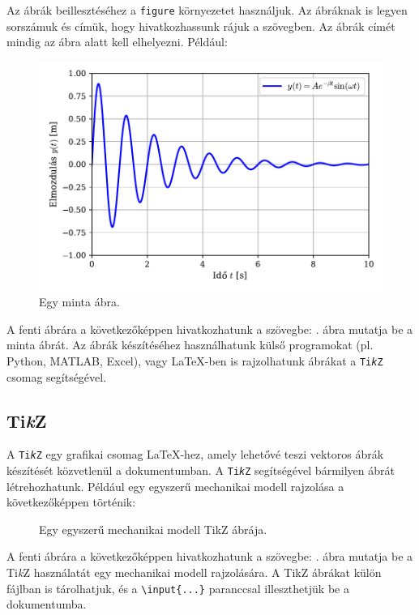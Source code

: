 \documentclass[fleqn,12pt]{article}
\begin{document}
        Az ábrák beillesztéséhez a \texttt{figure} környezetet használjuk. Az ábráknak is legyen sorszámuk és címük, hogy hivatkozhassunk rájuk a szövegben. Az ábrák címét mindig az ábra alatt kell elhelyezni. Például:
        \begin{figure}[htb!]
            \centering
            \includegraphics[width=0.75\linewidth]{figures/sample-fig.pdf}
            \caption{Egy minta ábra.}
            \label{fig:sample_figure}
        \end{figure}

        A fenti ábrára a következőképpen hivatkozhatunk a szövegbe: . ábra mutatja be a minta ábrát. Az ábrák készítéséhez használhatunk külső programokat (pl. Python, MATLAB, Excel), vagy \LaTeX-ben is rajzolhatunk ábrákat a \texttt{Ti\emph{k}Z} csomag segítségével.

    \subsection{Ti\emph{k}Z}

        A \texttt{Ti\emph{k}Z} egy grafikai csomag \LaTeX-hez, amely lehetővé teszi vektoros ábrák készítését közvetlenül a dokumentumban. A \texttt{Ti\emph{k}Z} segítségével bármilyen ábrát létrehozhatunk. Például egy egyszerű mechanikai modell rajzolása a következőképpen történik:
        \begin{figure}[htb!]
            \centering
            
            \caption{Egy egyszerű mechanikai modell TikZ ábrája.}
            \label{fig:tikz_example}
        \end{figure}

        A fenti ábrára a következőképpen hivatkozhatunk a szövegbe: . ábra mutatja be a Ti\emph{k}Z használatát egy mechanikai modell rajzolására. A TikZ ábrákat külön fájlban is tárolhatjuk, és a \texttt{\textbackslash input\{...\}} paranccsal illeszthetjük be a dokumentumba.
\end{document}
